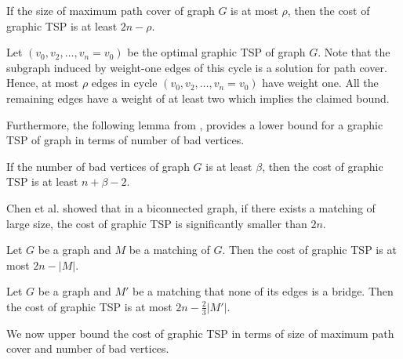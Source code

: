 \begin{claim}\label{lem: lower-bound-path}
If the size of maximum path cover of graph $G$ is at most $\rho$, then the cost of graphic TSP is at least $2n - \rho$.  
\end{claim}
\begin{myproof}
Let $(v_0, v_2, \ldots, v_n = v_0)$ be the optimal graphic TSP of graph $G$. Note that the subgraph induced by weight-one edges of this cycle is a solution for path cover. Hence, at most $\rho$ edges in cycle $(v_0, v_2, \ldots, v_n = v_0)$ have weight one. All the remaining edges have a weight of at least two which implies the claimed bound.
\end{myproof}

Furthermore, the following lemma from \cite{chen2020}, provides a lower bound for a graphic TSP of graph in terms of number of bad vertices.

\begin{lemma}\label{lem: lower-bound-bad-vertex}
If the number of bad vertices of graph $G$ is at least $\beta$, then the cost of graphic TSP is at least $n + \beta - 2$.
\end{lemma}


Chen et al. \cite{chen2020} showed that in a biconnected graph, if there exists a matching of large size, the cost of graphic TSP is significantly smaller than $2n$. 

\begin{lemma}\label{lem: tsp-matching-bound}
Let $G$ be a graph and $M$ be a matching of $G$. Then the cost of graphic TSP is at most $2n - |M|$.
\end{lemma}

\begin{lemma}\label{lem: non-bridge-matching}
Let $G$ be a graph and $M'$ be a matching that none of its edges is a bridge. Then the cost of graphic TSP is at most $2n - \frac{2}{3}|M'|$.
\end{lemma}

We now upper bound the cost of graphic TSP in terms of size of maximum path cover and number of bad vertices.


